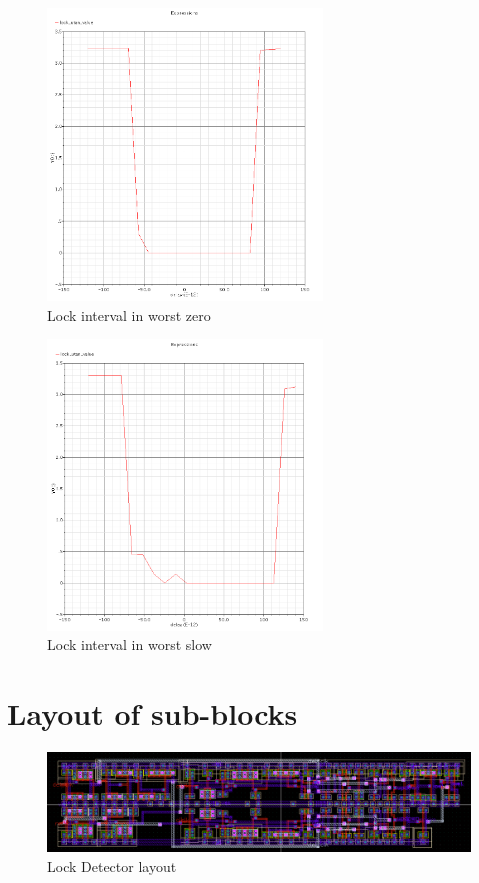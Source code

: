 \documentclass[a4paper,12pt]{article} \usepackage{graphicx}
\begin{document}
\begin{figure}[h]
  \centering
  \includegraphics[width=0.65\textwidth]{../Bilder/LD_tran/LD_lsim_wz.png}
  \caption{Lock interval in worst zero}
  \label{fig:LDwz}
\end{figure}

\begin{figure}[h]
  \centering
  \includegraphics[width=0.65\textwidth]{../Bilder/LD_tran/LD_lsim_ws.png}
  \caption{Lock interval in worst slow}
  \label{fig:LDws}
\end{figure}

\section{Layout of sub-blocks}
\label{sec:Layout}

\begin{figure}[h]
  \centering
  \includegraphics[width=1.0\textwidth]{../Bilder/LD_tran/LD.png}
  \caption{Lock Detector layout}
  \label{fig:LD}
\end{figure}
\end{document}

